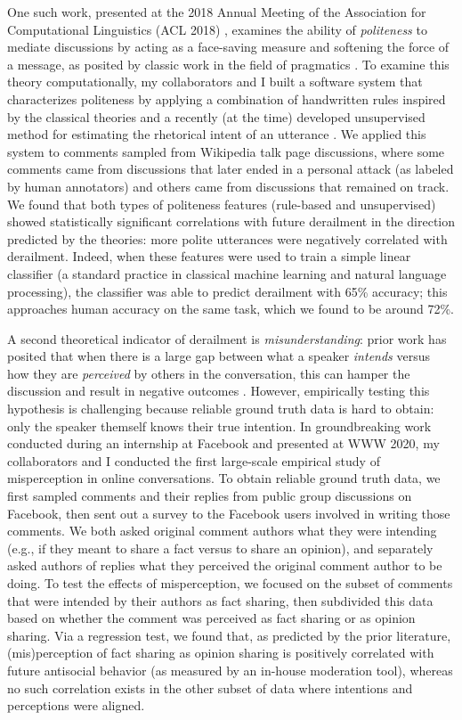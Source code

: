 \documentclass[11pt,letterpaper]{article}
\begin{document}
One such work, presented at the 2018 Annual Meeting of the Association for Computational Linguistics (ACL 2018) \cite{zhang_conversations_2018}, examines the ability of \emph{politeness} to mediate discussions by acting as a face-saving measure and softening the force of a message, as posited by classic work in the field of pragmatics \cite{clark_polite_1980-1,brown_politeness:_1987}.
To examine this theory computationally, my collaborators and I built a software system that characterizes politeness by applying a combination of handwritten rules inspired by the classical theories \cite{danescu-niculescu-mizil_computational_2013} and a recently (at the time) developed unsupervised method for estimating the rhetorical intent of an utterance \cite{zhang_asking_2017}.
We applied this system to comments sampled from Wikipedia talk page discussions, where some comments came from discussions that later ended in a personal attack (as labeled by human annotators) and others came from discussions that remained on track.
We found that both types of politeness features (rule-based and unsupervised) showed statistically significant correlations with future derailment in the direction predicted by the theories: more polite utterances were negatively correlated with derailment.
Indeed, when these features were used to train a simple linear classifier (a standard practice in classical machine learning and natural language processing), the classifier was able to predict derailment with 65\% accuracy; this approaches human accuracy on the same task, which we found to be around 72\%.

A second theoretical indicator of derailment is \emph{misunderstanding}: prior work has posited that when there is a large gap between what a speaker \emph{intends} versus how they are \emph{perceived} by others in the conversation, this can hamper the discussion and result in negative outcomes \cite{tannen_indirectness_2000}.
However, empirically testing this hypothesis is challenging because reliable ground truth data is hard to obtain: only the speaker themself knows their true intention.
In groundbreaking work conducted during an internship at Facebook and presented at WWW 2020, my collaborators and I conducted the first large-scale empirical study of misperception in online conversations.
To obtain reliable ground truth data, we first sampled comments and their replies from public group discussions on Facebook, then sent out a survey to the Facebook users involved in writing those comments.
We both asked original comment authors what they were intending (e.g., if they meant to share a fact versus to share an opinion), and separately asked authors of replies what they perceived the original comment author to be doing.
To test the effects of misperception, we focused on the subset of comments that were intended by their authors as fact sharing, then subdivided this data based on whether the comment was perceived as fact sharing or as opinion sharing.
Via a regression test, we found that, as predicted by the prior literature, (mis)perception of fact sharing as opinion sharing is positively correlated with future antisocial behavior (as measured by an in-house moderation tool), whereas no such correlation exists in the other subset of data where intentions and perceptions were aligned.
\end{document}
